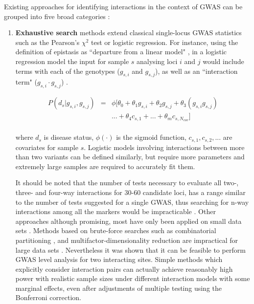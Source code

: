 Existing approaches for identifying interactions in the context of GWAS can be grouped into five broad categories \cite{li2011detecting}:
\begin{enumerate}
	\item \textbf{Exhaustive search} methods extend classical single-locus GWAS statistics such as the Pearson's $\chi^2$ test or logistic regression.
For instance, using the definition of epistasis as ``departure from a linear model" \cite{cordell2009detecting}, in a logistic regression model the input for sample $s$ analysing loci $i$ and $j$ would include terms with each of the genotypes ($g_{s,i}$ and $g_{s,j}$), as well as an ``interaction term" ($g_{s,i} \cdot g_{s,j}$) \cite{cordell2002epistasis}. 

\begin{eqnarray*} \label{eq:gwasLogRegH1}
    P( d_s | g_{s,i},g_{s,j}) & = & \phi[ \theta_0 + \theta_1 g_{s,i} + \theta_2 g_{s,j} + \theta_3 (g_{s,i} g_{s,j}) \\
    & & ... + \theta_4 c_{s,1} + ... + \theta_m c_{s,N_{cov}} ] \\
\end{eqnarray*}

where $d_s$ is disease status, $\phi(\cdot)$ is the sigmoid function, $c_{s,1}, c_{s,2}, ... $ are covariates for sample $s$.
Logistic models involving interactions between more than two variants can be defined similarly, but require more parameters and extremely large samples are required to accurately fit them.

It should be noted that the number of tests necessary to evaluate all two-, three- and four-way interactions for 30-60 candidate loci, has a range similar to the number of tests suggested for a single GWAS, thus searching for n-way interactions among all the markers would be impracticable \cite{culverhouse2002perspective}.
Other approaches \cite{nelson2001combinatorial, culverhouse2004detecting, ritchie2001multifactor, cook2004tree, zheng2006backward}
although promising, most have only been applied on small data sets \cite{zhang2007bayesian}.
Methods based on brute-force searches such as combinatorial partitioning \cite{nelson2001combinatorial}, and multifactor-dimensionality reduction \cite{ritchie2001multifactor} are impractical for large data sets \cite{zhang2007bayesian}.
Nevertheless it was shown \cite{li2011detecting} that it can be feasible to perform GWAS level analysis for two interacting sites.
Simple methods which explicitly consider interaction pairs can actually achieve reasonably high power with realistic sample sizes under different interaction models with some marginal effects, even after adjustments of multiple testing using the Bonferroni correction.
	

\end{enumerate}
